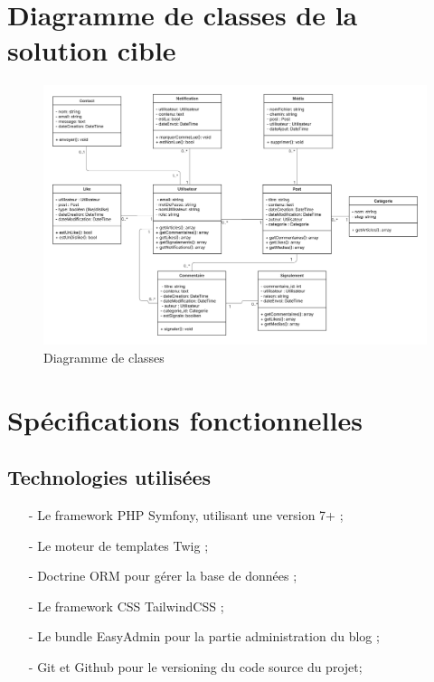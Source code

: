 \documentclass[12pt,a4paper]{article}
\begin{document}
\section{Diagramme de classes de la solution cible}

\begin{figure}[!h]
	\begin{center}
		\includegraphics[scale=.65]{diagramme.jpg}
		\caption{Diagramme de classes}
	\end{center}
\end{figure}	

\newpage

\section{Spécifications fonctionnelles}


\subsection{Technologies utilisées}

\begin{itemize}
	\item[-] Le framework PHP Symfony, utilisant une version 7+ ;
	\item[-] Le moteur de templates Twig ;
	\item[-] Doctrine ORM pour gérer la base de données ;
	\item[-] Le framework CSS TailwindCSS ;
	\item[-] Le bundle EasyAdmin pour la partie administration du blog ;
	\item[-] Git et Github pour le versioning du code source du projet;
\end{itemize}
\end{document}
